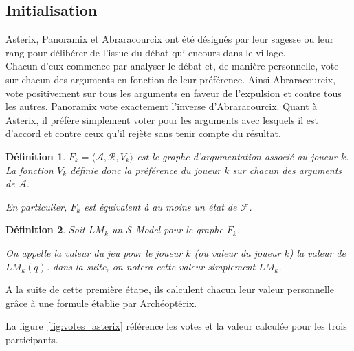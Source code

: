 \documentclass[11pt]{article}
\theoremstyle{defi}
\newtheorem{definition}{Définition}[section]
\theoremstyle{not}
\theoremstyle{prob}
\begin{document}
    \subsection{Initialisation}

      Asterix, Panoramix et Abraracourcix ont été désignés par leur sagesse ou leur rang pour délibérer de l'issue du débat qui encours dans le village.\\

      Chacun d'eux commence par analyser le débat et, de manière personnelle, vote sur chacun des arguments en fonction de leur préférence.
      Ainsi Abraracourcix, vote positivement sur tous les arguments en faveur de l'expulsion et contre tous les autres. Panoramix vote exactement l'inverse d'Abraracourcix.
      Quant à Asterix, il préfère simplement voter pour les arguments avec lesquels il est d'accord et contre ceux qu'il rejète sans tenir compte du résultat.

      \begin{definition}
        $F_k = \langle \mathcal{A}, \mathcal{R}, V_k \rangle$ est le graphe d'argumentation associé au joueur $k$.
        La fonction $V_k$ définie donc la préférence du joueur $k$ sur chacun des arguments de $\mathcal{A}$.

        En particulier, $F_k$ est équivalent à au moins un état de $\mathcal{F}$.
      \end{definition}
      \begin{definition}
        Soit $LM_k$ un $\mathcal{S}$-Model pour le graphe $F_k$.

        On appelle la valeur du jeu pour le joueur $k$ (ou valeur du joueur $k$) la valeur de $LM_k(q)$. dans la suite, on notera cette valeur simplement $LM_k$.
      \end{definition}

      A la suite de cette première étape, ils calculent chacun leur valeur personnelle grâce à une formule établie par Archéoptérix.

      La figure~\ref{fig:votes_asterix} référence les votes et la valeur calculée pour les trois participants.
\end{document}
